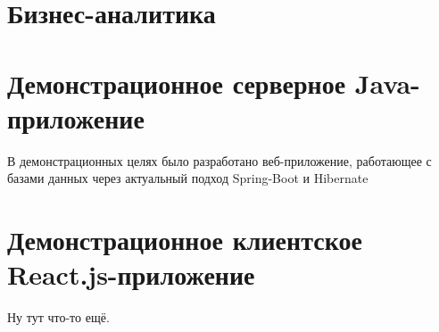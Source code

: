\documentclass[a4paper,12pt]{article}
\begin{document}
    \section{Бизнес-аналитика}\label{sec:-businessintelligence-}
    

    \section{Демонстрационное серверное Java-приложение}\label{sec:-javaapp-}
    В демонстрационных целях было разработано веб-приложение, работающее с базами данных через актуальный подход
    Spring-Boot и Hibernate

    \section{Демонстрационное клиентское React.js-приложение}\label{sec:-reactapp-}
    Ну тут что-то ещё.
\end{document}
